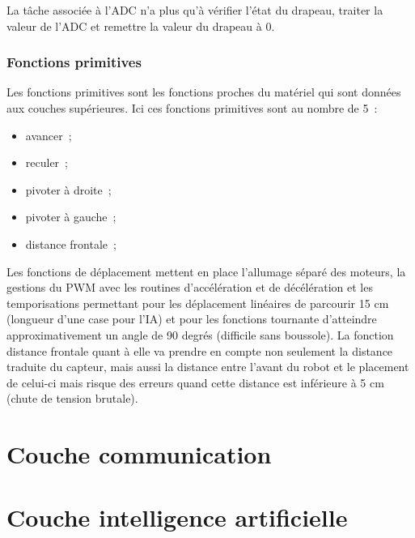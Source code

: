 \documentclass{article}
\begin{document}
La tâche associée à l'ADC n'a plus qu'à vérifier l'état du drapeau, traiter la valeur de l'ADC et remettre la valeur du drapeau à 0.

\subsubsection{Fonctions primitives}

Les fonctions primitives sont les fonctions proches du matériel qui sont données aux couches supérieures. Ici ces fonctions primitives sont au nombre de 5~:

\begin{itemize}
  \item avancer~;
  \item reculer~;
  \item pivoter à droite~;
  \item pivoter à gauche~;
  \item distance frontale~;
\end{itemize}

Les fonctions de déplacement mettent en place l'allumage séparé des moteurs, la gestions du PWM avec les routines d'accélération et de décélération et les temporisations permettant pour les déplacement linéaires de parcourir 15 cm (longueur d'une case pour l'IA) et pour les fonctions tournante d'atteindre approximativement un angle de 90 degrés (difficile sans boussole). La fonction distance frontale quant à elle va prendre en compte non seulement la distance traduite du capteur, mais aussi la distance entre l'avant du robot et le placement de celui-ci mais risque des erreurs quand cette distance est inférieure à 5 cm (chute de tension brutale). 

\section{Couche communication}

\section{Couche intelligence artificielle}
\end{document}
